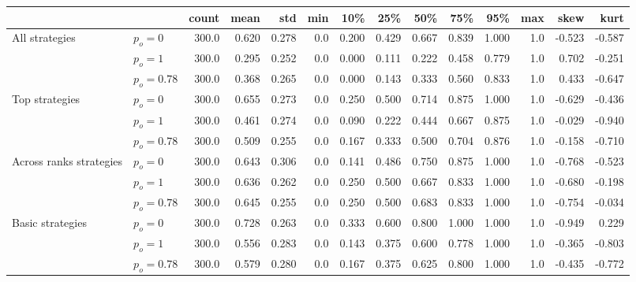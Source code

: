 \begin{tabular}{llrrrrrrrrrrrr}
\toprule
                 &            &  count &   mean &    std &  min &    10\% &    25\% &    50\% &    75\% &    95\% &  max &   skew &   kurt \\
\midrule
\rowcolor{Gray}
All strategies & $p_o=0$ &  300.0 &  0.620 &  0.278 &  0.0 &  0.200 &  0.429 &  0.667 &  0.839 &  1.000 &  1.0 & -0.523 & -0.587 \\
\rowcolor{Gray}
                 & $p_o=1$ &  300.0 &  0.295 &  0.252 &  0.0 &  0.000 &  0.111 &  0.222 &  0.458 &  0.779 &  1.0 &  0.702 & -0.251 \\
\rowcolor{Gray}
                 & $p_o=0.78$ &  300.0 &  0.368 &  0.265 &  0.0 &  0.000 &  0.143 &  0.333 &  0.560 &  0.833 &  1.0 &  0.433 & -0.647 \\
                 \midrule
Top strategies & $p_o=0$ &  300.0 &  0.655 &  0.273 &  0.0 &  0.250 &  0.500 &  0.714 &  0.875 &  1.000 &  1.0 & -0.629 & -0.436 \\
                 & $p_o=1$ &  300.0 &  0.461 &  0.274 &  0.0 &  0.090 &  0.222 &  0.444 &  0.667 &  0.875 &  1.0 & -0.029 & -0.940 \\
                 & $p_o=0.78$ &  300.0 &  0.509 &  0.255 &  0.0 &  0.167 &  0.333 &  0.500 &  0.704 &  0.876 &  1.0 & -0.158 & -0.710 \\
                 \midrule
\rowcolor{Gray}
Across ranks strategies & $p_o=0$ &  300.0 &  0.643 &  0.306 &  0.0 &  0.141 &  0.486 &  0.750 &  0.875 &  1.000 &  1.0 & -0.768 & -0.523 \\
\rowcolor{Gray}
                 & $p_o=1$ &  300.0 &  0.636 &  0.262 &  0.0 &  0.250 &  0.500 &  0.667 &  0.833 &  1.000 &  1.0 & -0.680 & -0.198 \\
\rowcolor{Gray}
                 & $p_o=0.78$ &  300.0 &  0.645 &  0.255 &  0.0 &  0.250 &  0.500 &  0.683 &  0.833 &  1.000 &  1.0 & -0.754 & -0.034 \\
                 \midrule
Basic strategies & $p_o=0$ &  300.0 &  0.728 &  0.263 &  0.0 &  0.333 &  0.600 &  0.800 &  1.000 &  1.000 &  1.0 & -0.949 &  0.229 \\
                 & $p_o=1$ &  300.0 &  0.556 &  0.283 &  0.0 &  0.143 &  0.375 &  0.600 &  0.778 &  1.000 &  1.0 & -0.365 & -0.803 \\
                 & $p_o=0.78$ &  300.0 &  0.579 &  0.280 &  0.0 &  0.167 &  0.375 &  0.625 &  0.800 &  1.000 &  1.0 & -0.435 & -0.772 \\
\bottomrule
\end{tabular}
